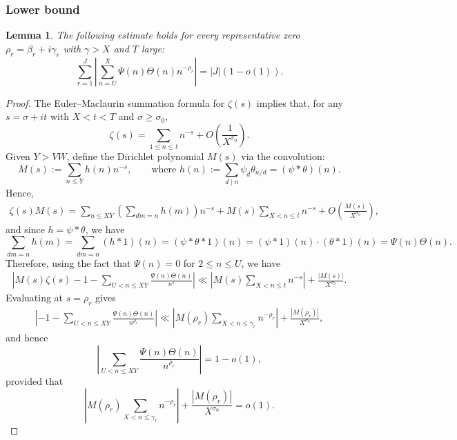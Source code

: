 \documentclass[reqno]{amsart}
\newtheorem{lemma}[theorem]{Lemma}
\numberwithin{equation}{section}
\theoremstyle{remark}
\begin{document}
\subsubsection{Lower bound}\begin{lemma}\label{lowerboundlemma}
    The following estimate holds for every representative zero $\rho_r=\beta_r+i\gamma_r$ with $\gamma> X$ and $T$ large:
    \begin{equation*}
    \sum_{r=1}^J\left|\sum_{n=U}^{X}\Psi(n)\Theta(n) n^{-\rho_r}\right|=|J|(1-o(1)).
    \end{equation*}
\end{lemma}
\begin{proof}
The Euler–Maclaurin summation formula for $\zeta(s)$ implies that, for any $s=\sigma+it$ with $X<t<T$ and $\sigma\ge \sigma_0$,
\begin{equation*}
\zeta(s)=\sum_{1 \leq n \leq t} n^{-s}+O\left( \frac{1}{X^{\sigma_0}}\right).
\end{equation*}
Given $Y>VW$, define the Dirichlet polynomial $M(s) $ via the convolution:
\[
M(s) := \sum_{n \le Y} h(n) n^{-s}, \qquad \text{where } h(n) := \sum_{d \mid n} \psi_d \theta_{n/d} = (\psi * \theta)(n).
\]
Hence,
\begin{align*}
  \zeta(s) M(s)=\sum_{n \le XY} \left( \sum_{dm = n} h(m) \right) n^{-s}+M(s)\sum_{X < n \leq t}n^{-s}+O\left(\frac{M(s)}{X^{\sigma_0}}\right),
\end{align*}
and since $h= \psi * \theta $, we have
\[
\sum_{dm = n} h(m) = \sum_{dm = n} (h * 1)(n) = (\psi * \theta * 1)(n) = (\psi * 1)(n) \cdot (\theta * 1)(n) = \Psi(n) \Theta(n).
\]
Therefore, using the fact that $\Psi(n)=0$ for $2\le n\le U$, we have 
\begin{align*}
    \left|M(s)\zeta(s)-1-\sum_{U<n\le XY}\frac{\Psi(n)\Theta (n)}{n^s}\right|\ll \left|M(s)\sum_{X < n \leq t}n^{-s}\right|+\frac{|M(s)|}{X^{\sigma_0}}.
\end{align*}
Evaluating at $s=\rho_r$ gives
\begin{align*}
    \left|-1-\sum_{U<n\le XY}\frac{\Psi(n)\Theta (n)}{n^{\rho_r}}\right|\ll \left|M(\rho_r)\sum_{X < n \leq \gamma_r}n^{-\rho_r}\right|+\frac{|M(\rho_r)|}{X^{\sigma_0}},
\end{align*}
and hence 
\begin{equation*}
    \left|\sum_{U<n\le XY}\frac{\Psi(n)\Theta (n)}{n^{\rho_r}}\right|= 1-o(1),
\end{equation*}
provided that
\begin{equation*}
    \left|M(\rho_r)\sum_{X < n \leq \gamma_r}n^{-\rho_r}\right|+\frac{|M(\rho_r)|}{X^{\sigma_0}}=o(1).

\end{equation*}
\end{proof}
\end{document}

